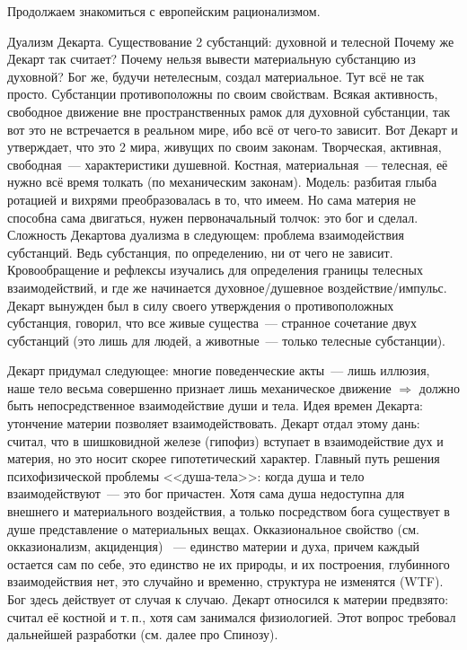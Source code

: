 Продолжаем знакомиться с европейским рационализмом.

Дуализм Декарта. Существование 2 субстанций: духовной и телесной
Почему же Декарт так считает? Почему нельзя вывести материальную субстанцию из духовной? Бог же, будучи нетелесным, создал материальное. Тут всё не так просто. Субстанции противоположны по своим свойствам. Всякая активность, свободное движение вне пространственных рамок для духовной субстанции, так вот это не встречается в реальном мире, ибо всё от чего-то зависит. Вот Декарт и утверждает, что это 2 мира, живущих по своим законам. Творческая, активная, свободная~--- характеристики душевной. Костная, материальная~--- телесная, её нужно всё время толкать (по механическим законам). Модель: разбитая глыба ротацией и вихрями преобразовалась в то, что имеем. Но сама материя не способна сама двигаться, нужен первоначальный толчок: это бог и сделал. 
Сложность Декартова дуализма в следующем: проблема взаимодействия субстанций. Ведь субстанция, по определению, ни от чего не зависит. Кровообращение и рефлексы изучались для определения границы телесных взаимодействий, и где же начинается духовное/душевное воздействие/импульс. Декарт вынужден был в силу своего утверждения о противоположных субстанция, говорил, что все живые существа~--- странное сочетание двух субстанций (это лишь для людей, а животные~--- только телесные субстанции). 

Декарт придумал следующее:
многие поведенческие акты~--- лишь иллюзия, наше тело весьма совершенно
признает лишь механическое движение $\Rightarrow$ должно быть непосредственное взаимодействие души и тела. Идея времен Декарта: утончение материи позволяет взаимодействовать. Декарт отдал этому дань: считал, что в шишковидной железе (гипофиз) вступает в взаимодействие дух и материя, но это носит скорее гипотетический характер. Главный путь решения психофизической проблемы <<душа-тела>>: когда душа и тело взаимодействуют~--- это бог причастен. Хотя сама душа недоступна для внешнего и материального воздействия, а только посредством бога существует в душе представление о материальных вещах. Окказиональное свойство (см. окказионализм, акциденция) ~--- единство материи и духа, причем каждый остается сам по себе, это единство не их природы, и их построения, глубинного взаимодействия нет, это случайно и временно, структура не изменятся (WTF). Бог здесь действует от случая к случаю. Декарт относился к материи предвзято: считал её костной и т.\,п., хотя сам занимался физиологией. Этот вопрос требовал дальнейшей разработки (см. далее про Спинозу). 

